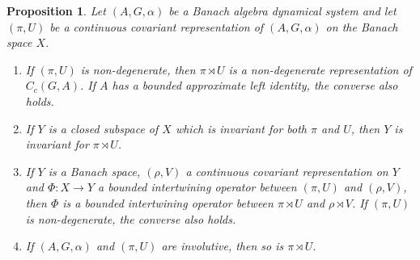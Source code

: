 \documentclass{amsart}
\theoremstyle{plain}
\newtheorem{prop}[theorem]{Proposition}
\theoremstyle{definition}
\numberwithin{equation}{section}
\begin{document}
\begin{prop}\label{p:integrated_form_is_non_degenerate_rep_of_C_c(G,A)}
 Let ${(A,G,\alpha)}$ be a Banach algebra dynamical system and let ${(\pi,U)}$ be a continuous covariant representation of ${(A,G,\alpha)}$ on the Banach space $X$.
\begin{enumerate}
 \item If ${(\pi,U)}$ is non-degenerate, then ${\pi \rtimes U}$ is a non-degenerate representation of $C_c(G,A)$. If $A$ has a bounded approximate left identity, the converse also holds.
 \item If $Y$ is a closed subspace of $X$ which is invariant for both $\pi$ and $U$, then $Y$ is invariant for ${\pi \rtimes U}$.
 \item If $Y$ is a Banach space, $(\rho, V)$ a continuous covariant representation on $Y$ and $\Phi: X \to Y$ a bounded intertwining operator between ${(\pi,U)}$ and $(\rho,V)$, then $\Phi$ is a bounded intertwining operator between ${\pi \rtimes U}$ and $\rho {\rtimes} V$. If ${(\pi,U)}$ is non-degenerate, the converse also holds.
 \item If ${(A,G,\alpha)}$ and ${(\pi,U)}$ are involutive, then so is ${\pi \rtimes U}$.
\end{enumerate}
\end{prop}
\end{document}
